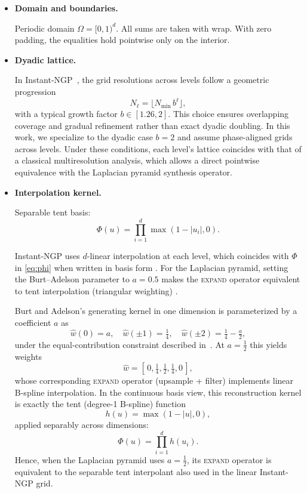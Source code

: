 \documentclass[a4paper,11pt,oneside]{article}
\numberwithin{equation}{section}
\begin{document}
\begin{itemize}
\item \textbf{Domain and boundaries.}

Periodic domain \(\Omega=[0,1)^d\).
All sums are taken with wrap. With zero padding, the equalities hold pointwise only on the interior.

\item \textbf{Dyadic lattice.}

In Instant-NGP~\cite{mueller2022instant}, the grid resolutions across
levels follow a geometric progression
\[
N_\ell = \big\lfloor N_{\min}\, b^\ell \big\rfloor,
\]
with a typical growth factor $b \in [1.26, 2]$.
This choice ensures overlapping coverage and gradual refinement rather
than exact dyadic doubling.
In this work, we specialize to the dyadic case $b=2$ and assume
phase-aligned grids across levels.
Under these conditions, each level’s lattice coincides with that of a
classical multiresolution analysis, which allows a direct pointwise
equivalence with the Laplacian pyramid synthesis operator.

\item \textbf{Interpolation kernel.}

Separable tent basis:
\begin{equation}
\label{eq:phi}
\Phi(u)=\prod_{i=1}^d \max(1-|u_i|,0).
\end{equation}

Instant-NGP uses \(d\)-linear interpolation at each level, which coincides with \(\Phi\) in \cref{eq:phi} when written in basis form \cite{mueller2022instant}. For the Laplacian pyramid, setting the Burt--Adelson parameter to \(a=0.5\) makes the \textsc{expand} operator equivalent to tent interpolation (triangular weighting) \cite{burt1983laplacian}.


    
Burt and Adelson's generating kernel in one dimension is parameterized by a coefficient $a$ as
\[
\hat w(0)=a,\quad
\hat w(\pm1)=\tfrac14,\quad
\hat w(\pm2)=\tfrac14-\tfrac a2,
\]
under the equal-contribution constraint described in~\cite{burt1983laplacian}.
At $a=\tfrac12$ this yields weights
\[
\hat w = [\,0,\tfrac14,\tfrac12,\tfrac14,0\,],
\]
whose corresponding \textsc{expand} operator (upsample + filter) implements
linear B-spline interpolation.
In the continuous basis view, this reconstruction kernel is exactly
the tent (degree-1 B-spline) function
\[
h(u) = \max(1 - |u|, 0),
\]
applied separably across dimensions:
\[
\Phi(u)=\prod_{i=1}^d h(u_i).
\]
Hence, when the Laplacian pyramid uses $a{=}\tfrac12$, its
\textsc{expand} operator is equivalent to the separable tent
interpolant also used in the linear Instant-NGP grid.


\end{itemize}
\end{document}
